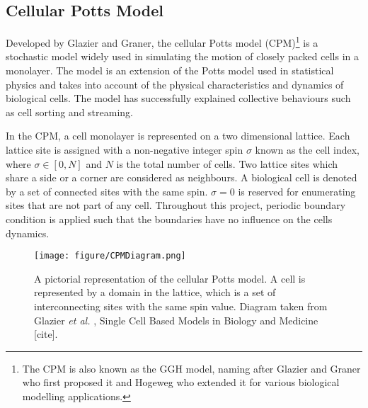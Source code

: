\documentclass[a4paper,12pt]{article}
\newcommand{\etal}{\textit{et al. }}
\begin{document}
\subsection{Cellular Potts Model}
Developed by Glazier and Graner\cite{graner1992}, the cellular Potts model (CPM)\footnote{The CPM is also known as the GGH model, naming after Glazier and Graner who first proposed it and Hogeweg who extended it for various biological modelling applications.} is a stochastic model widely used in simulating the motion of closely packed cells in a monolayer. The model is an extension of the Potts model used in statistical physics and takes into account of the physical characteristics and dynamics of biological cells. The model has successfully explained collective behaviours such as cell sorting \cite{graner1992} and streaming\cite{szabo2010}.

In the CPM, a cell monolayer is represented on a two dimensional lattice. Each lattice site is assigned with a non-negative integer spin $\sigma$ known as the cell index, where $\sigma \in [0,N]$ and $N$ is the total number of cells. Two lattice sites which share a side or a corner are considered as neighbours. A biological cell is denoted by a set of connected sites with the same spin. $\sigma = 0$ is reserved for enumerating sites that are not part of any cell. Throughout this project, periodic boundary condition is applied such that the boundaries have no influence on the cells dynamics.

\begin{figure}[h]
\centering
\texttt{[image: figure/CPMDiagram.png]}
\caption{A pictorial representation of the cellular Potts model. A cell is represented by a domain in the lattice, which is a set of interconnecting sites with the same spin value. Diagram taken from Glazier \etal, Single Cell Based Models in Biology and Medicine [cite].}
\label{fig:CPMDiagram}
\end{figure}
\end{document}
